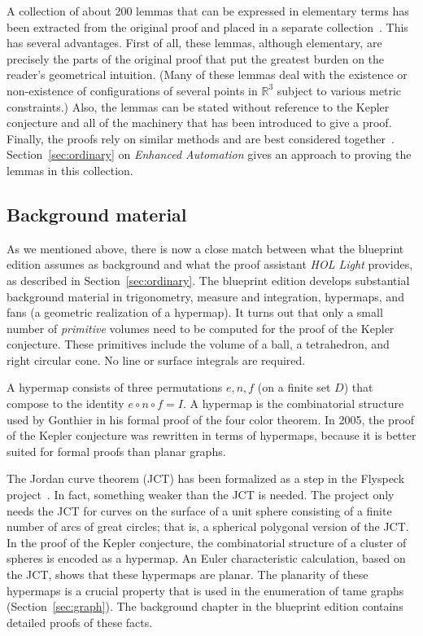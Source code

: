 \documentclass[11pt]{amsart}
\newcommand{\ring}[1]{\mathbb{#1}}
\begin{document}
A collection of about 200 lemmas that can be expressed in elementary terms has been extracted from 
the original proof and placed in a separate collection~\cite{hales:2008:collection}.  This has
several advantages.  First of all, these lemmas, although elementary, are precisely the parts of the
original proof that put the greatest burden on the reader's geometrical intuition.  (Many of these
lemmas deal with the existence or non-existence of configurations of several points in $\ring{R}^3$ subject to
various metric constraints.)  Also, the lemmas can be stated without reference to the Kepler conjecture and all of the
machinery that has been introduced to give a proof.
Finally, the proofs rely on similar methods and are best considered
together~\cite{1271687}.  Section~\ref{sec:ordinary} on {\it Enhanced Automation} gives an approach to proving the lemmas in this collection.

 

\subsection*{Background material}

As we mentioned above, there is now a close
match between what the blueprint edition assumes as background and what the proof assistant {\it HOL Light}
provides, as described in Section~\ref{sec:ordinary}.  The blueprint edition develops 
substantial background
material in trigonometry, measure and integration, hypermaps, and fans (a geometric realization of a hypermap).   It turns out
that only a small number of {\it primitive} volumes need to be computed for the proof of the Kepler
conjecture. These primitives include the volume of a ball, a tetrahedron, and right circular cone.  
No line or surface integrals are required.

A hypermap consists of  three permutations $e,n,f$ (on a finite set $D$) 
that compose to the identity $e\circ n\circ f= I$.  A hypermap is the
combinatorial structure used by Gonthier in his formal proof of the four color theorem.  In 2005,
the proof of the Kepler conjecture was rewritten in terms of hypermaps, because it is better suited
for formal proofs than planar graphs.  

The Jordan curve theorem (JCT) has been formalized as a step in the Flyspeck project~\cite{Hales:2007:jordan}.  In fact, something weaker than the JCT
is needed.  The project only needs the JCT for curves on
the surface of a unit sphere consisting of a finite number of arcs of great circles; that is, a 
spherical polygonal version of the JCT.  In the proof of the Kepler conjecture, the combinatorial structure of
a cluster of spheres is encoded as a hypermap.  An Euler characteristic calculation, based on the JCT, shows that
these hypermaps are planar.  The planarity of these hypermaps is a crucial property that is used in the enumeration
of tame graphs (Section~\ref{sec:graph}).
The background chapter in the blueprint edition contains detailed proofs of these facts.
\end{document}
